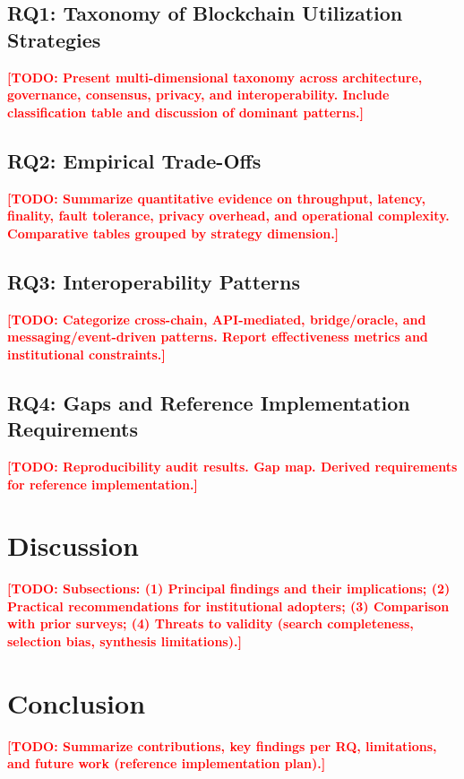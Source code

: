 \documentclass[journal]{IEEEtran}
\newcommand{\todo}[1]{\textcolor{red}{\textbf{[TODO: #1]}}}
\begin{document}
\subsection{RQ1: Taxonomy of Blockchain Utilization Strategies}

\todo{Present multi-dimensional taxonomy across architecture, governance, consensus, privacy, and interoperability. Include classification table and discussion of dominant patterns.}

\subsection{RQ2: Empirical Trade-Offs}

\todo{Summarize quantitative evidence on throughput, latency, finality, fault tolerance, privacy overhead, and operational complexity. Comparative tables grouped by strategy dimension.}

\subsection{RQ3: Interoperability Patterns}

\todo{Categorize cross-chain, API-mediated, bridge/oracle, and messaging/event-driven patterns. Report effectiveness metrics and institutional constraints.}

\subsection{RQ4: Gaps and Reference Implementation Requirements}

\todo{Reproducibility audit results. Gap map. Derived requirements for reference implementation.}

\section{Discussion}
\label{sec:discussion}

\todo{Subsections: (1) Principal findings and their implications; (2) Practical recommendations for institutional adopters; (3) Comparison with prior surveys; (4) Threats to validity (search completeness, selection bias, synthesis limitations).}

\section{Conclusion}
\label{sec:conclusion}

\todo{Summarize contributions, key findings per RQ, limitations, and future work (reference implementation plan).}



\end{document}
